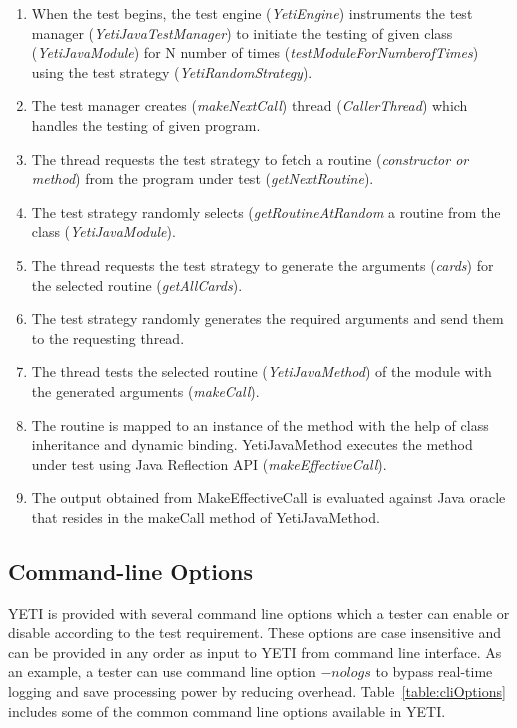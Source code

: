 \begin{enumerate}
\item When the test begins, the test engine (\textit{YetiEngine}) instruments the test manager (\textit{YetiJavaTestManager}) to initiate the testing of given class (\textit{YetiJavaModule}) for N number of times (\textit{testModuleForNumberofTimes}) using the test strategy (\textit{YetiRandomStrategy}).

\item The test manager creates (\textit{makeNextCall}) thread (\textit{CallerThread}) which handles the testing of given program.

\item The thread requests the test strategy to fetch a routine (\textit{constructor or method}) from the program under test (\textit{getNextRoutine}). 

\item The test strategy randomly selects (\textit{getRoutineAtRandom} a routine from the class (\textit{YetiJavaModule}).

\item The thread requests the test strategy to generate the arguments (\textit{cards}) for the selected routine (\textit{getAllCards}).

 \item The test strategy randomly generates the required arguments and send them to the requesting thread.
 
 \item The thread tests the selected routine (\textit{YetiJavaMethod}) of the module with the generated arguments (\textit{makeCall}).
 
 \item The routine is mapped to an instance of the method with the help of class inheritance and dynamic binding. YetiJavaMethod executes the method under test using Java Reflection API (\textit{makeEffectiveCall}).
 
\item The output obtained from MakeEffectiveCall is evaluated against Java oracle that resides in the makeCall method of YetiJavaMethod.

\end{enumerate}





\subsection{Command-line Options}
YETI is provided with several command line options which a tester can enable or disable according to the test requirement. These options are case insensitive and can be provided in any order as input to YETI from command line interface. As an example, a tester can use command line option $-nologs$ to bypass real-time logging and save processing power by reducing overhead. Table~\ref{table:cliOptions} includes some of the common command line options available in YETI.

